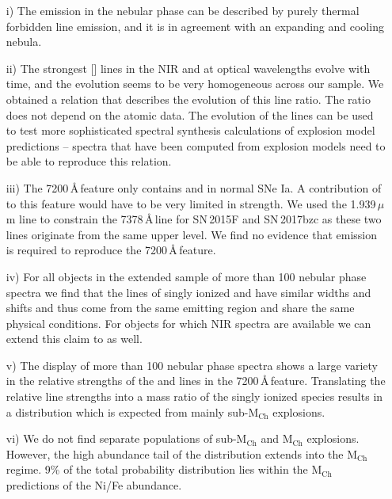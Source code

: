 \documentclass[fleqn,usenatbib]{mnras}
\begin{document}
\begin{itemize}
    \item[i)] The  emission in the nebular phase can be described by purely thermal forbidden line emission, and it is in agreement with an expanding and cooling nebula. 
    \item[ii)] The strongest [] lines in the NIR and at optical wavelengths evolve with time, and the evolution seems to be very homogeneous across our sample. We obtained a relation that describes the evolution of this line ratio. The ratio does not depend on the atomic data. The evolution of the  lines can be used to test more sophisticated spectral synthesis calculations of explosion model predictions -- spectra that have been computed from explosion models need to be able to reproduce this relation.
    \item[iii)] The 7200\,\AA\,feature only contains  and  in normal SNe Ia. A contribution of  to this feature would have to be very limited in strength. We used the 1.939\,$\mu$m line to constrain the 7378\,\AA\,line for SN\,2015F and SN\,2017bzc as these two lines originate from the same upper level. We find no evidence that  emission is required to reproduce the 7200\,\AA\,feature.
    \item[iv)] For all objects in the extended sample of more than 100 nebular phase spectra we find that the lines of singly ionized  and  have similar widths and shifts and thus come from the same emitting region and share the same physical conditions. For objects for which NIR spectra are available we can extend this claim to  as well. 
    \item[v)] The display of more than 100 nebular phase spectra shows a large variety in the relative strengths of the  and  lines in the 7200\,\AA\,feature. Translating the relative line strengths into a mass ratio of the singly ionized species results in a distribution which is expected from mainly sub-M$_{\text{Ch}}$ explosions.%
    \item[vi)] We do not find separate populations of sub-M$_{\text{Ch}}$ and M$_{\text{Ch}}$ explosions. However, the high abundance tail of the distribution extends into the M$_{\text{Ch}}$ regime. 9\% of the total probability distribution lies within the M$_{\text{Ch}}$ predictions of the Ni/Fe abundance.
\end{itemize}
\end{document}
